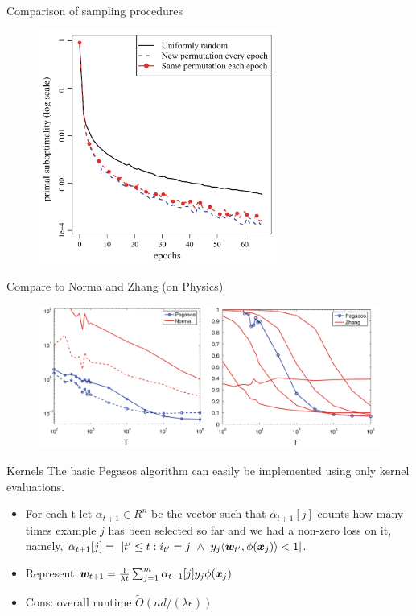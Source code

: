 \begin{frame}{Comparison of sampling procedures}
    \begin{figure}[htbp]
        \centering
        \includegraphics[height=0.7\textheight, width=0.7\textwidth]{images/epochs.png}
    \end{figure}
\end{frame}

\begin{frame}{Compare to Norma and Zhang (on Physics)}
    \begin{figure}[htbp]
        \centering
        \includegraphics[height=0.7\textheight, width=\textwidth]{images/comp_k.png}
    \end{figure}
\end{frame}

\begin{frame}{Kernels}
    The basic Pegasos algorithm can easily be implemented using only kernel evaluations.
    \begin{itemize}
        \item For each t let $\mathbb{\alpha}_{t+1}\in R^n$ be the vector such that $\alpha_{t+1}[j]$ counts how many times example $j$ has been selected so far and we had a non-zero loss on it, namely, $\alpha_{t+1}[j]=\ |{t'\le t:i_{t'}=j\ \wedge\ y_j\langle \wv_{t'},\phi(\xv_j)\rangle < 1}|$.
        \item Represent $\bm{w}_{t+1} = \frac{1}{\lambda t} \sum_{j=1}^{m} \alpha_{t+1}[j]y_j\phi(\bm{x}_j)$
        \item {\color{green}Cons: overall runtime $\tilde{O}(nd/(\lambda \epsilon))$}
    \end{itemize}
\end{frame}

